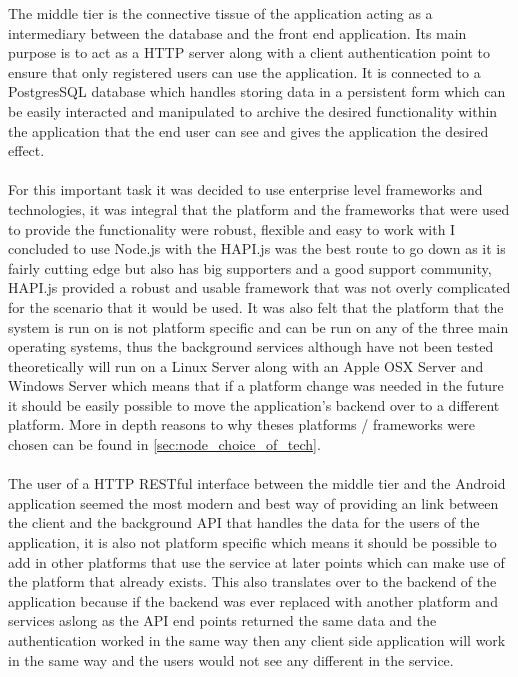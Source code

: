 The middle tier is the connective tissue of the application acting as a intermediary between the database and the front end application. Its main purpose is to act as a HTTP server along with a client authentication point to ensure that only registered users can use the application. It is connected to a PostgresSQL database which handles storing data in a persistent form which can be easily interacted and manipulated to archive the desired functionality within the application that the end user can see and gives the application the desired effect.\\
\\
For this important task it was decided to use enterprise level frameworks and technologies, it was integral that the platform and the frameworks that were used to provide the functionality were robust, flexible and easy to work with I concluded to use Node.js \cite{nodeteam:node:2015:online} with the HAPI.js \cite{hapiteam:hapti:2015:online} was the best route to go down as it is fairly cutting edge but also has big supporters and a good support community, HAPI.js provided a robust and usable framework that was not overly complicated for the scenario that it would be used. It was also felt that the platform that the system is run on is not platform specific and can be run on any of the three main operating systems, thus the background services although have not been tested theoretically will run on a Linux Server along with an Apple OSX Server and Windows Server which means that if a platform change was needed in the future it should be easily possible to move the application's backend over to a different platform. More in depth reasons to why theses platforms / frameworks were chosen can be found in \ref{sec:node_choice_of_tech}.\\
\\
The user of a HTTP RESTful interface between the middle tier and the Android application seemed the most modern and best way of providing an link between the client and the background API that handles the data for the users of the application, it is also not platform specific which means it should be possible to add in other platforms that use the service at later points which can make use of the platform that already exists. This also translates over to the backend of the application because if the backend was ever replaced with another platform and services aslong as the API end points returned the same data and the authentication worked in the same way then any client side application will work in the same way and the users would not see any different in the service.\\
